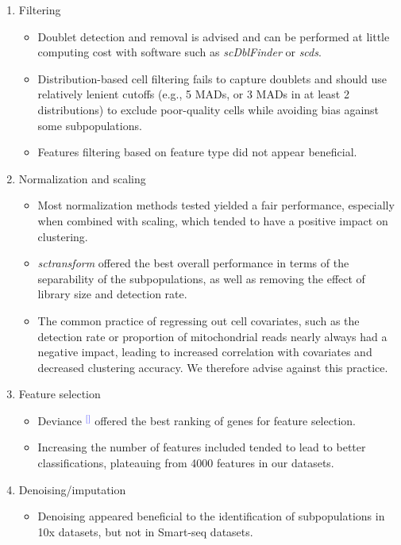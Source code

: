 \documentclass[11pt]{article}
\renewcommand{\cite}[1]{\textcolor{Blue}{$^[$\supercite{#1}$^]$}}
\begin{document}
\begin{enumerate}
   \item Filtering
   \begin{itemize}
     \item Doublet detection and removal is advised and can be performed at little computing cost with software such as \textit{scDblFinder} or \textit{scds}.
     \item Distribution-based cell filtering fails to capture doublets and should use relatively lenient cutoffs (e.g., 5 MADs, or 3 MADs in at least 2 distributions) to exclude poor-quality cells while avoiding bias against some subpopulations.
     \item Features filtering based on feature type did not appear beneficial.
   \end{itemize}
   \item Normalization and scaling
   \begin{itemize}
     \item Most normalization methods tested yielded a fair performance, especially when combined with scaling, which tended to have a positive impact on clustering.
     \item \textit{sctransform} offered the best overall performance in terms of the separability of the subpopulations, as well as removing the effect of library size and detection rate.
     \item The common practice of regressing out cell covariates, such as the detection rate or proportion of mitochondrial reads nearly always had a negative impact, leading to increased correlation with covariates and decreased clustering accuracy. We therefore advise against this practice.
   \end{itemize}
   \item Feature selection
   \begin{itemize}
     \item Deviance \cite{townesGlmpca2019} offered the best ranking of genes for feature selection.
     \item Increasing the number of features included tended to lead to better classifications, plateauing from 4000 features in our datasets.
   \end{itemize}
   \item Denoising/imputation
   \begin{itemize}
       \item Denoising appeared beneficial to the identification of subpopulations in 10x datasets, but not in Smart-seq datasets.

\end{itemize}
\end{enumerate}
\end{document}
